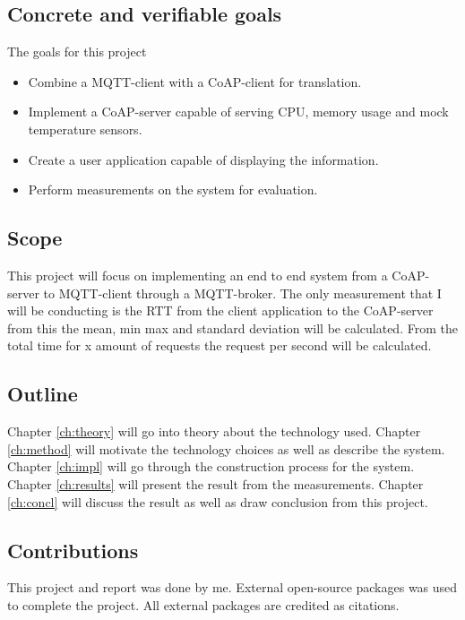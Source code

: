 \subsection{Concrete and verifiable goals}
\label{ch:intro:verifiable-goals}
The goals for this project
\begin{itemize}
    \item Combine a MQTT-client with a CoAP-client for translation.
    \item Implement a CoAP-server capable of serving CPU, memory usage and mock temperature sensors.
    \item Create a user application capable of displaying the information.
    \item Perform measurements on the system for evaluation.
\end{itemize}

\subsection{Scope}
\label{ch:intro:scope}
This project will focus on implementing an end to end system from a CoAP-server to MQTT-client through a MQTT-broker. The only measurement that I will be conducting is the RTT from the client application to the CoAP-server from this the mean, min max and standard deviation will be calculated. From the total time for x amount of requests the request per second will be calculated.

\subsection{Outline}
\label{ch:intro:outline}
Chapter \ref{ch:theory} will go into theory about the technology used. Chapter \ref{ch:method} will motivate the technology choices as well as describe the system. Chapter \ref{ch:impl} will go through the construction process for the system. Chapter \ref{ch:results} will present the result from the measurements. Chapter \ref{ch:concl} will discuss the result as well as draw conclusion from this project.

\subsection{Contributions}
\label{ch:intro:contributions}
This project and report was done by me. External open-source packages was used to complete the project. All external packages are credited as citations.


